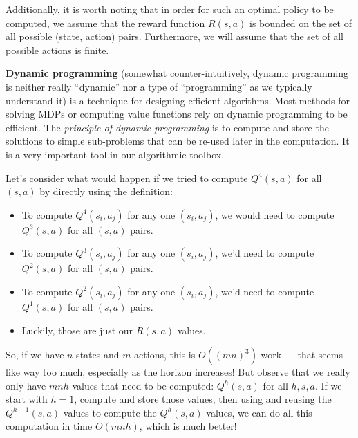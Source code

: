 Additionally, it is worth noting that in order for such an optimal policy to be
computed, we assume that the reward function $R(s,a)$ is bounded on the set of
all possible (state, action) pairs. Furthermore, we will assume that the set of
all possible actions is finite.

\begin{examplebox} {\bf Dynamic programming}
  (somewhat counter-intuitively, dynamic programming is neither really
  ``dynamic'' nor a type of ``programming'' as we typically understand
  it) is a technique for designing efficient algorithms.  Most methods
  for solving MDPs or computing value functions rely on dynamic
  programming to be efficient.  The {\em principle of dynamic
      programming} is to compute and store
  the solutions to simple sub-problems that can be re-used later in
  the computation.  It is a very important tool in our algorithmic
  toolbox.

  Let's consider what would happen if we tried to compute $Q^4(s,
    a)$ for all $(s, a)$ by directly using the definition:
  \begin{itemize}
    \item To compute $Q^4(s_i, a_j)$ for any one $(s_i, a_j)$, we would
          need to compute $Q^3(s, a)$ for all $(s, a)$
          pairs.
    \item To compute $Q^3(s_i, a_j)$ for any one $(s_i, a_j)$, we'd need to
          compute $Q^2(s, a)$ for all $(s, a)$ pairs.
    \item To compute $Q^2(s_i, a_j)$ for any one $(s_i, a_j)$, we'd
          need to compute $Q^1(s, a)$ for all $(s, a)$ pairs.
    \item Luckily, those are just our $R(s, a)$ values.
  \end{itemize}

  So, if we have $n$ states and $m$ actions, this is $O((mn)^3)$
  work --- that seems like way too much, especially as the horizon
  increases!  But observe that we really only have $mnh$ values that
  need to be computed: $Q^h(s, a)$ for all $h, s, a$.  If we start with
  $h=1$, compute and store those values, then using and reusing the
  $Q^{h-1}(s, a)$ values to compute the $Q^h(s, a)$ values, we can do
  all this computation in time $O(mnh)$, which is much better!

\end{examplebox}

